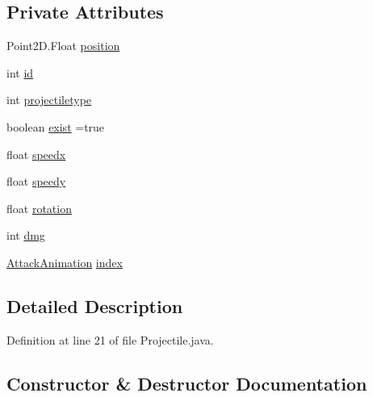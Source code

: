 \subsection*{Private Attributes}
\begin{DoxyCompactItemize}
\item 
Point2\+D.\+Float \hyperlink{classobjects_1_1_projectile_a9d76f6b9dbafc222b1d4ac8a6b1d4894}{position}
\item 
int \hyperlink{classobjects_1_1_projectile_a7441ef0865bcb3db9b8064dd7375c1ea}{id}
\item 
int \hyperlink{classobjects_1_1_projectile_a73505b2eeec69d02880a87f09d4ed6e8}{projectiletype}
\item 
boolean \hyperlink{classobjects_1_1_projectile_a8222e0b6d4ce0639cf85b9bc508fab80}{exist} =true
\item 
float \hyperlink{classobjects_1_1_projectile_a0e51383ba2b26548a0200e855f459416}{speedx}
\item 
float \hyperlink{classobjects_1_1_projectile_a13c57b666f056b5cae3bf6663337792c}{speedy}
\item 
float \hyperlink{classobjects_1_1_projectile_a1fc5a0e5fca1a310e6bfa125bf80042e}{rotation}
\item 
int \hyperlink{classobjects_1_1_projectile_aae5cd11bae27cb7df8bca2fd5fee775e}{dmg}
\item 
\hyperlink{classtowers_1_1_attack_animation}{Attack\+Animation} \hyperlink{classobjects_1_1_projectile_a66fd731a0df8a5ac0e96e7fbdab94e02}{index}
\end{DoxyCompactItemize}


\subsection{Detailed Description}


Definition at line 21 of file Projectile.\+java.



\subsection{Constructor \& Destructor Documentation}
\mbox{\label{classobjects_1_1_projectile_abfa5bb3317d35bef6eb884c6ffcce18e}} 
